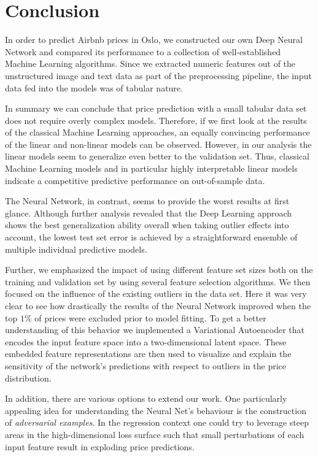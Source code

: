 \section{Conclusion}

In order to predict Airbnb prices in Oslo, we constructed our own Deep Neural Network and compared its performance to a collection of well-established Machine Learning algorithms.
Since we extracted numeric features out of the unstructured image and text data as part of the preprocessing pipeline, the input data fed into the models was of tabular nature.

In summary we can conclude that price prediction with a small tabular data set does not require overly complex models. Therefore, if we first look at the results of the classical Machine Learning approaches, an equally convincing performance of the linear and non-linear models can be observed. However, in our analysis the linear models seem to generalize even better to the validation set. Thus, classical Machine Learning models and in particular highly interpretable linear models indicate a competitive predictive performance on out-of-sample data.

The Neural Network, in contrast, seems to provide the worst results at first glance. Although further analysis revealed that the Deep Learning approach shows the best generalization ability overall when taking outlier effects into account, the lowest test set error is achieved by a straightforward ensemble of multiple individual predictive models.

Further, we emphasized the impact of using different feature set sizes both on the training and validation set by using several feature selection algorithms.
We then focused on the influence of the existing outliers in the data set.
Here it was very clear to see how drastically the results of the Neural Network improved when the top $1$\% of prices were excluded prior to model fitting.
To get a better understanding of this behavior we implemented a Variational Autoencoder that encodes the input feature space into a two-dimensional latent space.
These embedded feature representations are then used to visualize and explain the sensitivity of the network's predictions with respect to outliers in the price distribution.

In addition, there are various options to extend our work.
One particularly appealing idea for understanding the Neural Net's behaviour is the construction of \emph{adversarial examples}.
In the regression context one could try to leverage steep areas in the high-dimensional loss surface such that small perturbations of each input feature result in exploding price predictions.

